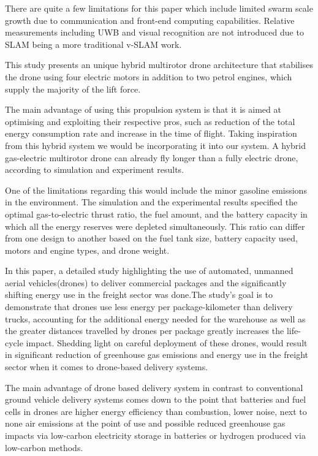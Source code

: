 \documentclass[conference]{IEEEtran}
\begin{document}
There are quite a few limitations for this paper which include limited swarm scale growth due to communication and front-end computing capabilities. Relative measurements including UWB and visual recognition are not introduced due to SLAM being a more traditional v-SLAM work\cite{lópez2017sensorial}.




This study presents an unique hybrid multirotor drone architecture that stabilises the drone using four electric motors in addition to two petrol engines, which supply the majority of the lift force.

The main advantage of using this propulsion system is that it is aimed at optimising and exploiting their respective pros, such as reduction of the total energy consumption rate and increase in the time of flight. Taking inspiration from this hybrid system we would be incorporating it into our system. A hybrid gas-electric multirotor drone can already fly longer than a fully electric drone, according to simulation and experiment results.

One of the limitations regarding this would include the minor gasoline emissions in the environment. The simulation and the experimental results specified the optimal gas-to-electric thrust ratio, the fuel amount, and the battery capacity in which all the energy reserves were depleted simultaneously. This ratio can differ from one design to another based on the fuel tank size, battery capacity used, motors and engine types, and drone weight\cite{stolaroff2018energy}.




In this paper, a detailed study highlighting the use of automated, unmanned aerial vehicles(drones) to deliver commercial packages and the significantly shifting energy use in the freight sector was done.The study's goal is to demonstrate that drones use less energy per package-kilometer than delivery trucks, accounting for the additional energy needed for the warehouse as well as the greater distances travelled by drones per package greatly increases the life-cycle impact. Shedding light on careful deployment of these drones, would result in significant reduction of greenhouse gas emissions and energy use in the freight sector when it comes to drone-based delivery systems.

The main advantage of drone based delivery system in contrast to conventional ground vehicle delivery systems comes down to the point that batteries and fuel cells in drones are higher energy efficiency than combustion, lower noise, next to none air emissions at the point of use and possible reduced greenhouse gas impacts via low-carbon electricity storage in batteries or hydrogen produced via low-carbon methods.
\end{document}
